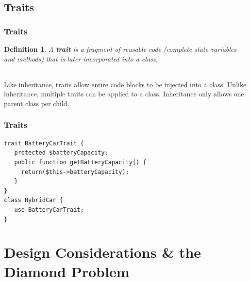 \documentclass[aspectratio=169]{beamer}
\newtheorem{defn}{Definition}
\begin{document}
\subsection{Traits}
\begin{frame}
\frametitle{Traits}
\begin{defn}
A \textbf{trait} is a fragment of reusable code (complete state variables and methods) that is later incorporated into a class.
\end{defn}

\pause
\mbox{}\\
Like inheritance, traits allow entire code blocks to be injected into a class. Unlike inheritance, multiple traits can be applied to a class. Inheritance only allows one parent class per child.
\end{frame}

\begin{frame}[fragile]
\frametitle{Traits}
\begin{lstlisting}[caption=Creating a Hybrid Car with a Battery Trait]
trait BatteryCarTrait {
   protected $batteryCapacity;
   public function getBatteryCapacity() {
     return($this->batteryCapacity);
   }
}
class HybridCar {
   use BatteryCarTrait;
}
\end{lstlisting}
\end{frame}

\section{Design Considerations \& the Diamond Problem}
\end{document}

